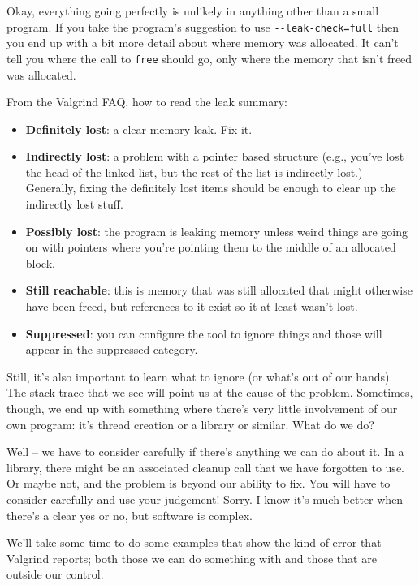 \documentclass[a4paper]{report}
\begin{document}
Okay, everything going perfectly is unlikely in anything other than a small program.  If you take the program's suggestion to use \verb+--leak-check=full+ then you end up with a bit more detail about where memory was allocated. It can't tell you where the call to \texttt{free} should go, only where the memory that isn't freed was allocated.

From the Valgrind FAQ, how to read the leak summary:
\begin{itemize}
	\item \textbf{Definitely lost}: a clear memory leak. Fix it.
	\item \textbf{Indirectly lost}: a problem with a pointer based structure (e.g., you've lost the head of the linked list, but the rest of the list is indirectly lost.) Generally, fixing the definitely lost items should be enough to clear up the indirectly lost stuff.
	\item \textbf{Possibly lost}: the program is leaking memory unless weird things are going on with pointers where you're pointing them to the middle of an allocated block.
	\item \textbf{Still reachable}: this is memory that was still allocated that might otherwise have been freed, but references to it exist so it at least wasn't lost.
	\item \textbf{Suppressed}: you can configure the tool to ignore things and those will appear in the suppressed category.
\end{itemize}

Still, it's also important to learn what to ignore (or what's out of our hands). The stack trace that we see will point us at the cause of the problem. Sometimes, though, we end up with something where there's very little involvement of our own program: it's thread creation or a library or similar. What do we do?

Well -- we have to consider carefully if there's anything we can do about it. In a library, there might be an associated cleanup call that we have forgotten to use. Or maybe not, and the problem is beyond our ability to fix. You will have to consider carefully and use your judgement! Sorry. I know it's much better when there's a clear yes or no, but software is complex.

We'll take some time to do some examples that show the kind of error that Valgrind reports; both those we can do something with and those that are outside our control.
\end{document}
